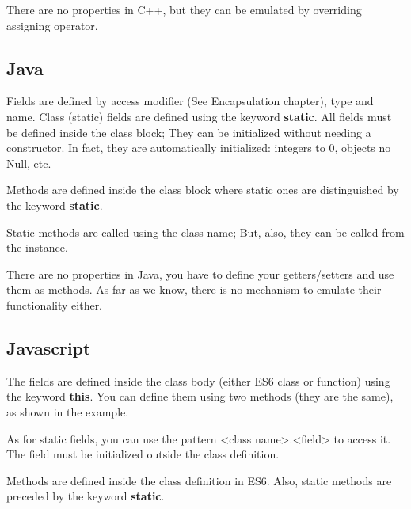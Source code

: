\documentclass{KodeBook}
\begin{document}
There are no properties in C++, but they can be emulated by overriding assigning operator.

\subsection{Java}

Fields are defined by access modifier (See Encapsulation chapter), type and name. 
Class (static) fields are defined using the keyword \textbf{static}.
All fields must be defined inside the class block; They can be initialized without needing a constructor. 
In fact, they are automatically initialized: integers to 0, objects no Null, etc. 



Methods are defined inside the class block where static ones are distinguished by the keyword \textbf{static}.



Static methods are called using the class name; But, also, they can be called from the instance. 



There are no properties in Java, you have to define your getters/setters and use them as methods. 
As far as we know, there is no mechanism to emulate their functionality either.


\subsection{Javascript}

The fields are defined inside the class body (either ES6 class or function) using the keyword \textbf{this}. 
You can define them using two methods (they are the same), as shown in the example.



As for static fields, you can use the pattern <class name>.<field> to access it. 
The field must be initialized outside the class definition.



Methods are defined inside the class definition in ES6. 
Also, static methods are preceded by the keyword \textbf{static}. 
\end{document}
